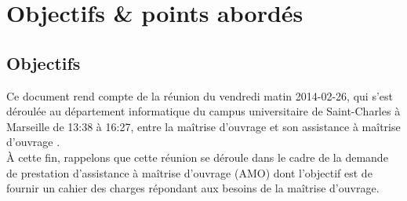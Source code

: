 \documentclass[11pt,fleqn]{report}
\begin{document}
\ZMakeCover


\chapter{Objectifs \& points abordés}

\section{Objectifs}
Ce document rend compte de la réunion du vendredi matin 2014-02-26, qui s'est déroulée au département informatique du campus universitaire de Saint-Charles à Marseille de 13:38 à 16:27, entre la maîtrise d'ouvrage \mo et son assistance à maîtrise d'ouvrage \amo.
\\
À cette fin, rappelons que cette réunion se déroule dans le cadre de la demande de prestation d'assistance à maîtrise d'ouvrage (AMO) dont l'objectif est de fournir un cahier des charges répondant aux besoins de la maîtrise d'ouvrage.
\end{document}
